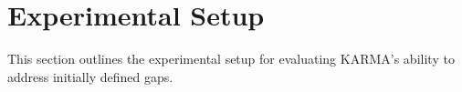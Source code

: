 \documentclass[conference]{IEEEtran}
\begin{document}
%





\section{Experimental Setup}
\label{sec:experiments}

This section outlines the experimental setup for evaluating KARMA's ability to address initially defined gaps.
\end{document}
